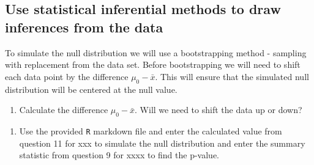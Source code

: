 \documentclass[
]{report}
\newenvironment{Shaded}{\begin{snugshade}}{\end{snugshade}}
\newcommand{\CommentTok}[1]{\textcolor[rgb]{0.56,0.35,0.01}{\textit{#1}}}
\newcommand{\DataTypeTok}[1]{\textcolor[rgb]{0.13,0.29,0.53}{#1}}
\newcommand{\DecValTok}[1]{\textcolor[rgb]{0.00,0.00,0.81}{#1}}
\newcommand{\KeywordTok}[1]{\textcolor[rgb]{0.13,0.29,0.53}{\textbf{#1}}}
\newcommand{\NormalTok}[1]{#1}
\newcommand{\OperatorTok}[1]{\textcolor[rgb]{0.81,0.36,0.00}{\textbf{#1}}}
\newcommand{\StringTok}[1]{\textcolor[rgb]{0.31,0.60,0.02}{#1}}
\providecommand{\tightlist}{%
  \setlength{\itemsep}{0pt}\setlength{\parskip}{0pt}}
\begin{document}
\vspace{0.3in}

\hypertarget{use-statistical-inferential-methods-to-draw-inferences-from-the-data}{%
\subsection{Use statistical inferential methods to draw inferences from the data}\label{use-statistical-inferential-methods-to-draw-inferences-from-the-data}}

To simulate the null distribution we will use a bootstrapping method - sampling with replacement from the data set. Before bootstrapping we will need to shift each data point by the difference \(\mu_0 - \bar{x}\). This will ensure that the simulated null distribution will be centered at the null value.

\begin{enumerate}
\def\labelenumi{\arabic{enumi}.}
\setcounter{enumi}{10}
\tightlist
\item
  Calculate the difference \(\mu_0 - \bar{x}\). Will we need to shift the data up or down?
\end{enumerate}

\vspace{.7in}

\begin{enumerate}
\def\labelenumi{\arabic{enumi}.}
\setcounter{enumi}{11}
\tightlist
\item
  Use the provided \texttt{R} markdown file and enter the calculated value from question 11 for xxx to simulate the null distribution and enter the summary statistic from question 9 for xxxx to find the p-value.
\end{enumerate}

\begin{Shaded}
\end{Shaded}
\end{document}
